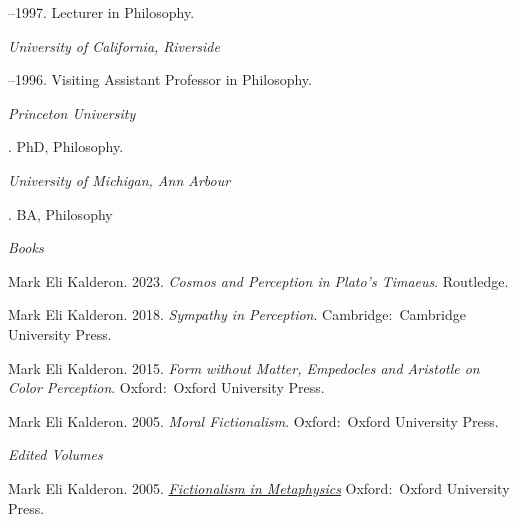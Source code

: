 \documentclass[11pt]{article}
\begin{document}
--1997. Lecturer in Philosophy.

\medskip
\noindent\emph{University of California, Riverside \vspace{0.01in}}

--1996. Visiting Assistant Professor in Philosophy.


\bigskip



\noindent\emph{Princeton University \vspace{0.01in}}

. PhD, Philosophy.

\medskip
\noindent\emph{University of Michigan, Ann Arbour\vspace{0.02in}}

. BA, Philosophy

\bigskip
 
\medskip
\noindent\emph{Books \vspace{0.01in}}


\ind Mark Eli Kalderon. 2023.
\emph{Cosmos and Perception in Plato's \emph{Timaeus}}. Routledge. %

\ind Mark Eli Kalderon. 2018.
\emph{Sympathy in Perception}. Cambridge:~Cambridge University Press. %

\ind Mark Eli Kalderon. 2015. \emph{Form without Matter, Empedocles and Aristotle on Color Perception}. Oxford:~Oxford University Press. %

\ind Mark Eli Kalderon. 2005. \emph{Moral Fictionalism}. Oxford:~Oxford University Press. %

\medskip
\noindent\emph{Edited Volumes \vspace{0.01in}}

\ind Mark Eli Kalderon. 2005. \emph{\href{http://ukcatalogue.oup.com/product/9780199282180.do}{Fictionalism in Metaphysics}} Oxford:~Oxford University Press. %
 
\end{document}
